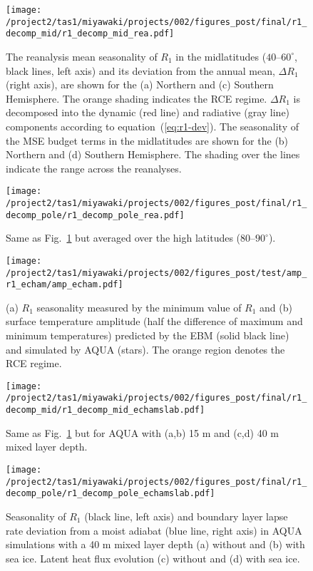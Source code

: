 \documentclass{ametsocV5}
\begin{document}
\begin{figure}[t]
  \noindent\texttt{[image: /project2/tas1/miyawaki/projects/002/figures\_post/final/r1\_decomp\_mid/r1\_decomp\_mid\_rea.pdf]}\\
  \caption{The reanalysis mean seasonality of $R_{1}$ in the midlatitudes ($40$--$60^{\circ}$, black lines, left axis) and its deviation from the annual mean, $\Delta R_1$ (right axis), are shown for the (a) Northern and (c) Southern Hemisphere. The orange shading indicates the RCE regime. $\Delta R_1$ is decomposed into the dynamic (red line) and radiative (gray line) components according to equation~(\ref{eq:r1-dev}). The seasonality of the MSE budget terms in the midlatitudes are shown for the (b) Northern and (d) Southern Hemisphere. The shading over the lines indicate the range across the reanalyses.}
  \label{fig:rea-r1-decomp-mid}
\end{figure}

\begin{figure}[t]
  \noindent\texttt{[image: /project2/tas1/miyawaki/projects/002/figures\_post/final/r1\_decomp\_pole/r1\_decomp\_pole\_rea.pdf]}\\
  \caption{Same as Fig.~\ref{fig:rea-r1-decomp-mid} but averaged over the high latitudes ($80$--$90^{\circ}$).}
  \label{fig:rea-r1-decomp-pole}
\end{figure}

\begin{figure}
  \noindent\texttt{[image: /project2/tas1/miyawaki/projects/002/figures\_post/test/amp\_r1\_echam/amp\_echam.pdf]}\\
  \caption{(a) $R_1$ seasonality measured by the minimum value of $R_1$ and (b) surface temperature amplitude (half the difference of maximum and minimum temperatures) predicted by the EBM (solid black line) and simulated by AQUA (stars). The orange region denotes the RCE regime.}
  \label{fig:amp-r1-echam}
\end{figure}

\begin{figure}[t]
    \noindent\texttt{[image: /project2/tas1/miyawaki/projects/002/figures\_post/final/r1\_decomp\_mid/r1\_decomp\_mid\_echamslab.pdf]}\\
    \caption{Same as Fig.~\ref{fig:rea-r1-decomp-mid} but for AQUA with (a,b) 15 m and (c,d) 40 m mixed layer depth.}
\label{fig:echam-rce}
\end{figure}

\begin{figure}[t]
    \noindent\texttt{[image: /project2/tas1/miyawaki/projects/002/figures\_post/final/r1\_decomp\_pole/r1\_decomp\_pole\_echamslab.pdf]}\\
    \caption{Seasonality of $R_1$ (black line, left axis) and boundary layer lapse rate deviation from a moist adiabat (blue line, right axis) in AQUA simulations with a 40 m mixed layer depth (a) without and (b) with sea ice. Latent heat flux evolution (c) without and (d) with sea ice.}
    \label{fig:echam-rae}
\end{figure}
\end{document}
